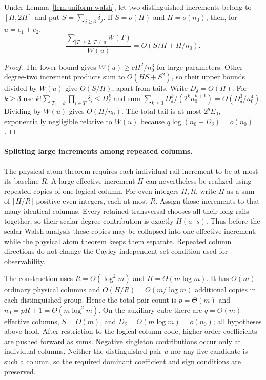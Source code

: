 \begin{lemma}\label{lem:dominant-increments}
Under Lemma~\ref{lem:uniform-walsh}, let two distinguished increments
belong to $[H,2H]$ and put $S=\sum_{j\ge3}\delta_j$.
If $S=o(H)$ and $H=o(n_0)$, then, for $u=e_1+e_2$,
\begin{equation}\label{eq:dominance-sum}
 \frac{\sum_{|T|\ge2,\ T\ne u}W(T)}{W(u)}
 =O(S/H+H/n_0).
\end{equation}
\end{lemma}
\begin{proof}
The lower bound gives $W(u)\ge cH^2/n_0^3$ for large parameters.
Other degree-two increment products sum to $O(HS+S^2)$, so their
upper bounds divided by $W(u)$ give $O(S/H)$, apart from tails.
Write $D_\delta=O(H)$. For $k\ge3$ use
$k!\sum_{|T|=k}\prod_{i\in T}\delta_i\le D_\delta^k$ and sum
$\sum_{k\ge3}D_\delta^k/(2^k n_0^{k+1})=O(D_\delta^3/n_0^4)$.
Dividing by $W(u)$ gives $O(H/n_0)$.
The total tail is at most $2^qE_0$, exponentially negligible relative
to $W(u)$ because $q\log(n_0+D_\delta)=o(n_0)$.
\end{proof}

\paragraph{Splitting large increments among repeated columns.}
The physical atom theorem requires each individual rail increment to
be at most its baseline $R$. A large effective increment $H$ can
nevertheless be realized using repeated copies of one logical column.
For even integers $H,R$, write $H$ as a sum of
$\lceil H/R\rceil$ positive even integers, each at most $R$.
Assign those increments to that many identical columns. Every retained
transversal chooses all their long rails together, so their scalar
degree contribution is exactly $H(a\cdot s)$.
Thus before the scalar Walsh analysis these copies may be collapsed
into one effective increment, while the physical atom theorem keeps
them separate. Repeated column directions do not change the Cayley
independent-set condition used for observability.

The construction uses $R=\Theta(\log^2m)$ and
$H=\Theta(m\log m)$. It has $O(m)$ ordinary physical columns and
$O(H/R)=O(m/\log m)$ additional copies in each distinguished group.
Hence the total pair count is $p=\Theta(m)$ and
$n_0=pR+1=\Theta(m\log^2m)$. On the auxiliary cube there are
$q=O(m)$ effective columns, $S=O(m)$, and
$D_\delta=O(m\log m)=o(n_0)$; all hypotheses above hold.
After restriction to the logical column code, higher-order coefficients
are pushed forward as sums. Negative singleton contributions occur only
at individual columns. Neither the distinguished pair $u$ nor any live
candidate is such a column, so the required dominant coefficient and
sign conditions are preserved.
